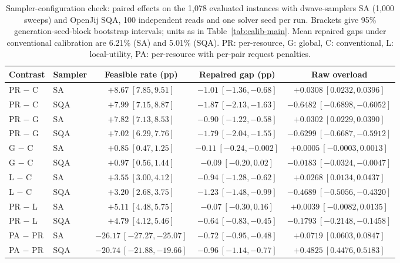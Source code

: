\documentclass[pdflatex,sn-nature]{sn-jnl}
\theoremstyle{plain}
\theoremstyle{remark}
\begin{document}
\begin{table}[t]
\caption{Sampler-configuration check: paired effects on the 1,078 evaluated instances with dwave-samplers SA (1,000 sweeps) and OpenJij SQA, 100 independent reads and one solver seed per run. Brackets give 95\% generation-seed-block bootstrap intervals; units as in Table~\ref{tab:calib-main}. Mean repaired gaps under conventional calibration are 6.21\% (SA) and 5.01\% (SQA). PR: per-resource, G: global, C: conventional, L: local-utility, PA: per-resource with per-pair request penalties.}\label{tab:calib-sampler}
\centering
\footnotesize
\setlength{\tabcolsep}{3pt}
\begin{tabular}{@{}llccc@{}}
\toprule
Contrast & Sampler & Feasible rate (pp) & Repaired gap (pp) & Raw overload\\
\midrule
PR $-$ C & SA & $+8.67\ [7.85,9.51]$ & $-1.01\ [-1.36,-0.68]$ & $+0.0308\ [0.0232,0.0396]$\\
PR $-$ C & SQA & $+7.99\ [7.15,8.87]$ & $-1.87\ [-2.13,-1.63]$ & $-0.6482\ [-0.6898,-0.6052]$\\
PR $-$ G & SA & $+7.82\ [7.13,8.53]$ & $-0.90\ [-1.22,-0.58]$ & $+0.0302\ [0.0229,0.0390]$\\
PR $-$ G & SQA & $+7.02\ [6.29,7.76]$ & $-1.79\ [-2.04,-1.55]$ & $-0.6299\ [-0.6687,-0.5912]$\\
G $-$ C & SA & $+0.85\ [0.47,1.25]$ & $-0.11\ [-0.24,-0.002]$ & $+0.0005\ [-0.0003,0.0013]$\\
G $-$ C & SQA & $+0.97\ [0.56,1.44]$ & $-0.09\ [-0.20,0.02]$ & $-0.0183\ [-0.0324,-0.0047]$\\
L $-$ C & SA & $+3.55\ [3.00,4.12]$ & $-0.94\ [-1.28,-0.62]$ & $+0.0268\ [0.0134,0.0437]$\\
L $-$ C & SQA & $+3.20\ [2.68,3.75]$ & $-1.23\ [-1.48,-0.99]$ & $-0.4689\ [-0.5056,-0.4320]$\\
PR $-$ L & SA & $+5.11\ [4.48,5.75]$ & $-0.07\ [-0.30,0.16]$ & $+0.0039\ [-0.0082,0.0135]$\\
PR $-$ L & SQA & $+4.79\ [4.12,5.46]$ & $-0.64\ [-0.83,-0.45]$ & $-0.1793\ [-0.2148,-0.1458]$\\
PA $-$ PR & SA & $-26.17\ [-27.27,-25.07]$ & $-0.72\ [-0.95,-0.48]$ & $+0.0719\ [0.0603,0.0847]$\\
PA $-$ PR & SQA & $-20.74\ [-21.88,-19.66]$ & $-0.96\ [-1.14,-0.77]$ & $+0.4825\ [0.4476,0.5183]$\\
\bottomrule
\end{tabular}
\end{table}
\end{document}
